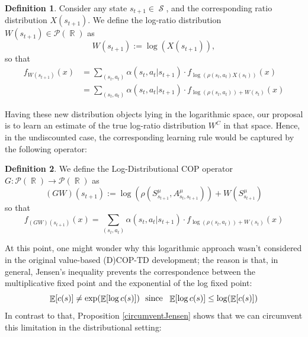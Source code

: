 \documentclass[12pt,a4paper,openright,twoside]{article}
\DeclareMathOperator*{\E}{\mathbb{E}}
\DeclareMathOperator*{\R}{\mathbb{R}}
\DeclareMathOperator*{\Sspace}{\mathcal{S}}
\numberwithin{equation}{section}
\theoremstyle{definition}
\newtheorem{definition}{Definition}
\theoremstyle{remark}
\theoremstyle{plain}
\begin{document}
\begin{definition}
	Consider any state $s_{t+1}\in \Sspace$, and the corresponding ratio distribution $X(s_{t+1})$. We define the log-ratio distribution $W(s_{t+1})\in \mathscr{P}(\R)$ as
\begin{equation*}
	W(s_{t+1}) := \log \left( X(s_{t+1}) \right), %
\end{equation*}
so that
\begin{equation*}
\begin{split}
	f_{W(s_{t+1})} (x) &= \sum_{(s_{t},a_{t})} \alpha(s_{t},a_{t}|s_{t+1}) \cdot f_{\log\left( \rho(s_{t},a_{t}) X(s_{t}) \right)}(x) \\
	&= \sum_{(s_{t},a_{t})} \alpha(s_{t},a_{t}|s_{t+1}) \cdot f_{\log\left( \rho(s_{t},a_{t})\right) + W(s_t)}(x)
\end{split}
\end{equation*}
\end{definition}

Having these new distribution objects lying in the logarithmic space, our proposal is to learn an estimate of the true log-ratio distribution $W^C$ in that space. Hence, in the undiscounted case, the corresponding learning rule would be captured by the following operator:

\begin{definition}
	We define the Log-Distributional COP operator $G: \mathscr{P}(\R) \rightarrow \mathscr{P}(\R)$ as
	\begin{equation}
		(G W) (s_{t+1}) := \log \left( \rho(S^{\mu}_{s_{t+1}},A^{\mu}_{s_{t},s_{t+1}}) \right) + W(S^{\mu}_{s_{t+1}})
	\end{equation}
	so that
	\begin{equation*}
		f_{(GW)(s_{t+1})} (x) = \sum_{(s_{t},a_{t})} \alpha(s_{t},a_{t}|s_{t+1}) \cdot f_{\log\left( \rho(s_{t},a_{t})\right) + W(s_t)}(x)
	\end{equation*}
\end{definition}

At this point, one might wonder why this logarithmic approach wasn't considered in the original value-based (D)COP-TD development; the reason is that, in general, Jensen's inequality prevents the correspondence between the multiplicative fixed point and the exponential of the log fixed point:
\begin{equation*}
	\E [c(s)] \neq \exp (\E[\log c(s)]) \ \textnormal{ since } \ \E[\log c(s)] \leq \log( \E [c(s)] )
\end{equation*}
In contrast to that, Proposition \ref{circumventJensen} shows that we can circumvent this limitation in the distributional setting:  
\end{document}
